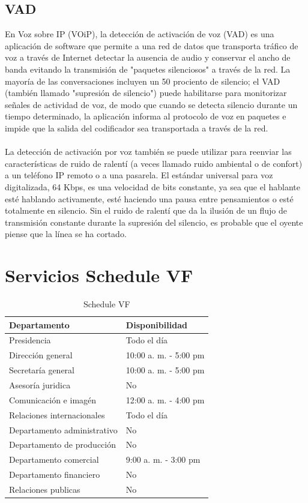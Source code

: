 \documentclass[12pt,letterpaper]{article}
\begin{document}
\subsection{VAD}
En Voz sobre IP (VOiP), la detección de activación de voz (VAD) es una aplicación de software 
que permite a una red de datos que transporta tráfico de voz a través de Internet detectar la 
ausencia de audio y conservar el ancho de banda evitando la transmisión de "paquetes 
silenciosos" a través de la red. La mayoría de las conversaciones incluyen un 50 prociento 
de silencio; el VAD (también llamado "supresión de silencio") puede habilitarse para 
monitorizar señales de actividad de voz, de modo que cuando se detecta silencio durante un 
tiempo determinado, la aplicación informa al protocolo de voz en paquetes e impide que la 
salida del codificador sea transportada a través de la red.
\\ \\
La detección de activación por voz también se puede utilizar para reenviar las características 
de ruido de ralentí (a veces llamado ruido ambiental o de confort) a un teléfono IP remoto 
o a una pasarela. El estándar universal para voz digitalizada, 64 Kbps, es una velocidad de 
bits constante, ya sea que el hablante esté hablando activamente, esté haciendo una pausa 
entre pensamientos o esté totalmente en silencio. Sin el ruido de ralentí que da la ilusión 
de un flujo de transmisión constante durante la supresión del silencio, es probable que el 
oyente piense que la línea se ha cortado.

\newpage
\section{Servicios Schedule VF}
\begin{table}[ht]
    \centering
    \begin{tabular}{|l|l|}
    \hline
    Departamento & Disponibilidad \\ \hline
    Presidencia & Todo el día \\ \hline
    Dirección general & 10:00 a. m. - 5:00 pm \\ \hline
    Secretaría general & 10:00 a. m. - 5:00 pm \\ \hline
    Asesoría juridica & No \\ \hline
    Comunicación e imagén & 12:00 a. m. - 4:00 pm \\ \hline
    Relaciones internacionales & Todo el día \\ \hline
    Departamento administrativo & No \\ \hline
    Departamento de producción & No \\ \hline
    Departamento comercial & 9:00 a. m. - 3:00 pm \\ \hline
    Departamento financiero & No \\ \hline
    Relaciones publicas & No \\ \hline
    \end{tabular}
    \caption{Schedule VF}
    \label{my-label}
\end{table}
\end{document}
